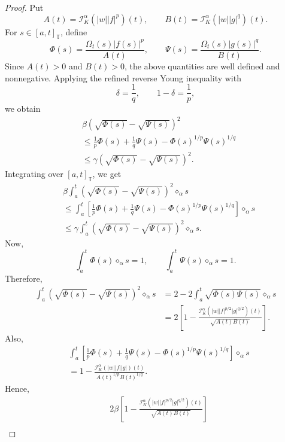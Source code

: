 \documentclass[10pt,a4paper]{amsart}
\begin{document}
\begin{proof}
Put
\[
    A(t)=\mathcal{I}_{K}^{\alpha}(|w||f|^p)(t),
    \qquad
    B(t)=\mathcal{I}_{K}^{\alpha}(|w||g|^q)(t).
\]
For $s\in[a,t]_{\mathbb{T}}$, define
\[
    \Phi(s)=\frac{\Omega_t(s)|f(s)|^p}{A(t)},
    \qquad
    \Psi(s)=\frac{\Omega_t(s)|g(s)|^q}{B(t)}.
\]
Since $A(t)>0$ and $B(t)>0$, the above quantities are well defined and
nonnegative. Applying the refined reverse Young inequality with
\[
    \delta=\frac1q,
    \qquad
    1-\delta=\frac1p,
\]
we obtain
\[
\begin{aligned}
&\beta\left(\sqrt{\Phi(s)}-\sqrt{\Psi(s)}\right)^2     \\
&\leq
\frac1p\Phi(s)+\frac1q\Psi(s)
-\Phi(s)^{1/p}\Psi(s)^{1/q}                            \\
&\leq
\gamma\left(\sqrt{\Phi(s)}-\sqrt{\Psi(s)}\right)^2 .
\end{aligned}
\]
Integrating over $[a,t]_{\mathbb{T}}$, we get
\[
\begin{aligned}
&\beta\int_a^t
\left(\sqrt{\Phi(s)}-\sqrt{\Psi(s)}\right)^2
\diamond_{\alpha}s                                      \\
&\leq
\int_a^t
\left[
\frac1p\Phi(s)+\frac1q\Psi(s)
-\Phi(s)^{1/p}\Psi(s)^{1/q}
\right]\diamond_{\alpha}s                               \\
&\leq
\gamma\int_a^t
\left(\sqrt{\Phi(s)}-\sqrt{\Psi(s)}\right)^2
\diamond_{\alpha}s .
\end{aligned}
\]
Now,
\[
    \int_a^t \Phi(s)\diamond_{\alpha}s=1,
    \qquad
    \int_a^t \Psi(s)\diamond_{\alpha}s=1.
\]
Therefore,
\[
\begin{aligned}
\int_a^t
\left(\sqrt{\Phi(s)}-\sqrt{\Psi(s)}\right)^2
\diamond_{\alpha}s
&=
2-2\int_a^t\sqrt{\Phi(s)\Psi(s)}\diamond_{\alpha}s       \\
&=
2\left[
1-
\frac{
\mathcal{I}_{K}^{\alpha}
\left(|w||f|^{p/2}|g|^{q/2}\right)(t)
}
{\sqrt{A(t)B(t)}}
\right].
\end{aligned}
\]
Also,
\[
\begin{aligned}
&\int_a^t
\left[
\frac1p\Phi(s)+\frac1q\Psi(s)
-\Phi(s)^{1/p}\Psi(s)^{1/q}
\right]\diamond_{\alpha}s                                \\
&=
1-
\frac{
\mathcal{I}_{K}^{\alpha}(|w||f||g|)(t)
}
{
A(t)^{1/p}B(t)^{1/q}
}.
\end{aligned}
\]
Hence,
\[
\begin{aligned}
&2\beta
\left[
1-
\frac{
\mathcal{I}_{K}^{\alpha}
\left(|w||f|^{p/2}|g|^{q/2}\right)(t)
}
{\sqrt{A(t)B(t)}}
\right]                                                   \\

\end{aligned}\]
\end{proof}
\end{document}
